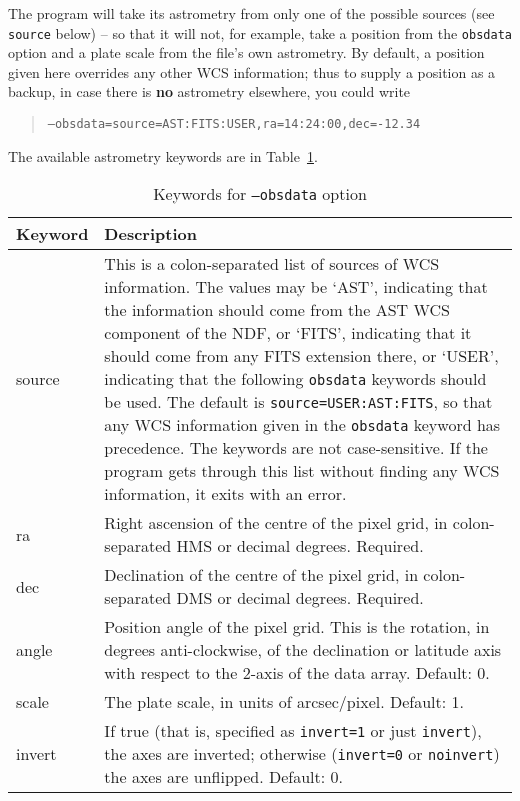 \documentclass[twoside,11pt]{article}
\begin{document}
The program will take its astrometry from only one of the possible sources
(see \texttt{source} below) -- so that it will not, for example, take a
position from the \texttt{obsdata} option and a plate scale from the file's
own astrometry.  By default, a position given here overrides any other WCS
information; thus to supply a position as a backup, in case there is
\textbf{no} astrometry elsewhere, you could write
\begin{quote}
  \texttt{--obsdata=source=AST:FITS:USER,ra=14:24:00,dec=-12.34}
\end{quote}
The available astrometry keywords are in Table~\ref{tab:obsdata}.

\begin{table}
\begin{center}
\begin{tabular}{l|p{10cm}}
Keyword & Description \\ \hline
source & This is a colon-separated list of sources of WCS information. The
values may be `AST', indicating that the information should come from the AST
WCS component of the NDF, or `FITS', indicating that it should come from any
FITS extension there, or `USER', indicating that the following
\texttt{obsdata} keywords should be used. The default is
\texttt{source=USER:AST:FITS}, so that any WCS information given in the
\texttt{obsdata} keyword has precedence. The keywords are not
case-sensitive. If the program gets through this list without finding any WCS
information, it exits with an error.\\
ra & Right ascension of the centre of the pixel grid, in colon-separated HMS
or decimal degrees. Required.\\
dec & Declination of the centre of the pixel grid, in colon-separated DMS or
decimal degrees. Required.\\
angle & Position angle of the pixel grid. This is the rotation, in degrees
anti-clockwise, of the declination or latitude axis with respect to the 2-axis
of the data array. Default: 0.\\
scale & The plate scale, in units of arcsec/pixel. Default: 1.\\
invert & If true (that is, specified as \texttt{invert=1} or just
\texttt{invert}), the axes are inverted; otherwise (\texttt{invert=0} or
\texttt{noinvert}) the axes are unflipped. Default: 0.
\end{tabular}
\end{center}
\caption{\label{tab:obsdata}Keywords for \texttt{--obsdata} option}
\end{table}
\end{document}
